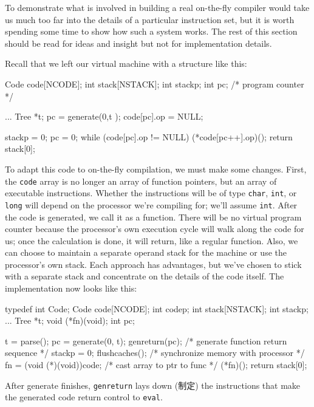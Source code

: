 To demonstrate what is involved in building a real on-the-fly compiler
would take us much too far into the details of a particular instruction
set, but it is worth spending some time to show how such a system works.
The rest of this section should be read for ideas and insight but not for
implementation details.

Recall that we left our virtual machine with a structure like this:
\begin{wellcode}
    Code code[NCODE];
    int stack[NSTACK];
    int stackp;
    int pc; /* program counter */

        ...
        Tree    *t;
        pc = generate(0,t );
        code[pc].op = NULL;

        stackp = 0;
        pc = 0;
        while (code[pc].op != NULL)
            (*code[pc++].op)();
        return stack[0];
\end{wellcode}

To adapt this code to on-the-fly compilation, we must make some changes.
First, the \verb'code' array is no longer an array of function pointers,
but an array of executable instructions. Whether the instructions will be
of type \verb'char', \verb'int', or \verb'long' will depend on the
processor we're compiling for; we'll assume \verb'int'. After the code is
generated, we call it as a function. There will be no virtual program
counter because the processor's own execution cycle will walk along the
code for us; once the calculation is done, it will return, like a regular
function. Also, we can choose to maintain a separate operand stack for the
machine or use the processor's own stack. Each approach has advantages, but
we've chosen to stick with a separate stack and concentrate on the details
of the code itself. The implementation now looks like this:
\begin{wellcode}
    typedef int Code;
    Code    code[NCODE];
    int codep;
    int stack[NSTACK];
    int stackp;
        ...
        Tree *t;
        void (*fn)(void);
        int pc;

        t = parse();
        pc = generate(0, t);
        genreturn(pc);      /* generate function return sequence */
        stackp = 0;
        flushcaches();      /* synchronize memory with processor */
        fn = (void (*)(void))code;  /* cast array to ptr to func */
        (*fn)();
        return stack[0];
\end{wellcode}

After generate finishes, \verb'genreturn' lays down (制定) the instructions
that make the generated code return control to \verb'eval'.

